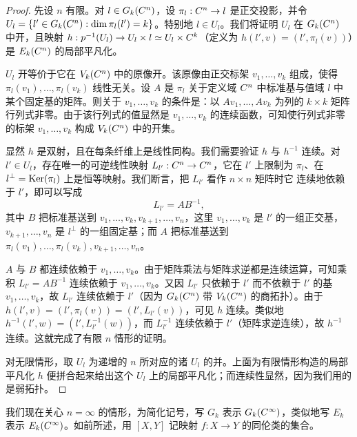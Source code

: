 \begin{proof}
先设 $n$ 有限。对 $l\in G_k(C^n)$，设 $\pi_l: C^n\to l$ 是正交投影，并令 $U_l=\{l'\in G_k(C^n) : \dim\pi_l(l')=k\}$。特别地 $l\in U_l$。我们将证明 $U_l$ 在 $G_k(C^n)$ 中开，且映射 $h: p^{-1}(U_l)\to U_l\times l\simeq U_l\times C^k$（定义为 $h(l',v)=(l',\pi_l(v))$）是 $E_k(C^n)$ 的局部平凡化。

$U_l$ 开等价于它在 $V_k(C^n)$ 中的原像开。该原像由正交标架 $v_1,\dots,v_k$ 组成，使得 $\pi_l(v_1),\dots,\pi_l(v_k)$ 线性无关。设 $A$ 是 $\pi_l$ 关于定义域 $C^n$ 中标准基与值域 $l$ 中某个固定基的矩阵。则关于 $v_1,\dots,v_k$ 的条件是：以 $Av_1,\dots,Av_k$ 为列的 $k\times k$ 矩阵行列式非零。由于该行列式的值显然是 $v_1,\dots,v_k$ 的连续函数，可知使行列式非零的标架 $v_1,\dots,v_k$ 构成 $V_k(C^n)$ 中的开集。

显然 $h$ 是双射，且在每条纤维上是线性同构。我们需要验证 $h$ 与 $h^{-1}$ 连续。对 $l'\in U_l$，存在唯一的可逆线性映射 $L_{l'}: C^n\to C^n$，它在 $l'$ 上限制为 $\pi_l$、在 $l^\perp=\operatorname{Ker}(\pi_l)$ 上是恒等映射。我们断言，把 $L_{l'}$ 看作 $n\times n$ 矩阵时它
连续地依赖于 $l'$，即可以写成
\[ L_{l'}=AB^{-1}, \]
其中 $B$ 把标准基送到 $v_1,\dots,v_k,v_{k+1},\dots,v_n$，这里 $v_1,\dots,v_k$ 是 $l'$ 的一组正交基，$v_{k+1},\dots,v_n$ 是 $l^\perp$ 的一组固定基；而 $A$ 把标准基送到 $\pi_l(v_1),\dots,\pi_l(v_k),v_{k+1},\dots,v_n$。

$A$ 与 $B$ 都连续依赖于 $v_1,\dots,v_k$。由于矩阵乘法与矩阵求逆都是连续运算，可知乘积 $L_{l'}=AB^{-1}$ 连续依赖于 $v_1,\dots,v_k$。又因 $L_{l'}$ 只依赖于 $l'$ 而不依赖于 $l'$ 的基 $v_1,\dots,v_k$，故 $L_{l'}$ 连续依赖于 $l'$（因为 $G_k(C^n)$ 带 $V_k(C^n)$ 的商拓扑）。由于 $h(l',v)=(l',\pi_l(v))=(l',L_{l'}(v))$，可见 $h$ 连续。类似地 $h^{-1}(l',w)=(l',L_{l'}^{-1}(w))$，而 $L_{l'}^{-1}$ 连续依赖于 $l'$（矩阵求逆连续），故 $h^{-1}$ 连续。这就完成了有限 $n$ 情形的证明。

对无限情形，取 $U_l$ 为递增的 $n$ 所对应的诸 $U_l$ 的并。上面为有限情形构造的局部平凡化 $h$ 便拼合起来给出这个 $U_l$ 上的局部平凡化；而连续性显然，因为我们用的是弱拓扑。
\end{proof}


我们现在关心 $n=\infty$ 的情形，为简化记号，写 $G_k$ 表示 $G_k(C^\infty)$，类似地写 $E_k$ 表示 $E_k(C^\infty)$。如前所述，用 $[X,Y]$ 记映射 $f: X\to Y$ 的同伦类的集合。

